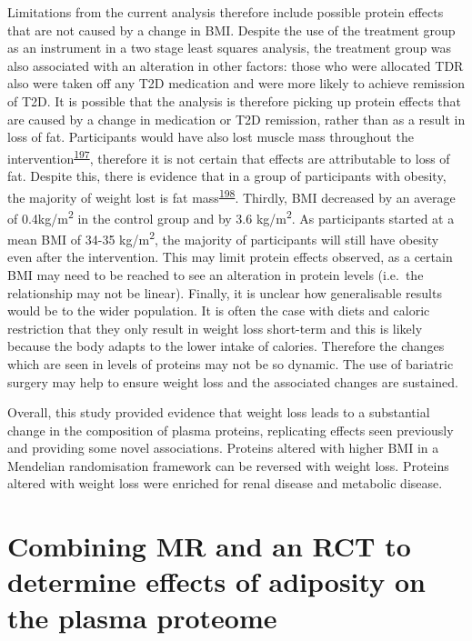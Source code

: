 \documentclass[11pt,twoside]{bristolthesis}
\begin{document}
Limitations from the current analysis therefore include possible protein effects that are not caused by a change in BMI. Despite the use of the treatment group as an instrument in a two stage least squares analysis, the treatment group was also associated with an alteration in other factors: those who were allocated TDR also were taken off any T2D medication and were more likely to achieve remission of T2D. It is possible that the analysis is therefore picking up protein effects that are caused by a change in medication or T2D remission, rather than as a result in loss of fat. Participants would have also lost muscle mass throughout the intervention\textsuperscript{\protect\hyperlink{ref-Santanasto2011}{197}}, therefore it is not certain that effects are attributable to loss of fat. Despite this, there is evidence that in a group of participants with obesity, the majority of weight lost is fat mass\textsuperscript{\protect\hyperlink{ref-Backx2016}{198}}. Thirdly, BMI decreased by an average of 0.4kg/m\textsuperscript{2} in the control group and by 3.6 kg/m\textsuperscript{2}. As participants started at a mean BMI of 34-35 kg/m\textsuperscript{2}, the majority of participants will still have obesity even after the intervention. This may limit protein effects observed, as a certain BMI may need to be reached to see an alteration in protein levels (i.e.~the relationship may not be linear). Finally, it is unclear how generalisable results would be to the wider population. It is often the case with diets and caloric restriction that they only result in weight loss short-term and this is likely because the body adapts to the lower intake of calories. Therefore the changes which are seen in levels of proteins may not be so dynamic. The use of bariatric surgery may help to ensure weight loss and the associated changes are sustained.

Overall, this study provided evidence that weight loss leads to a substantial change in the composition of plasma proteins, replicating effects seen previously and providing some novel associations. Proteins altered with higher BMI in a Mendelian randomisation framework can be reversed with weight loss. Proteins altered with weight loss were enriched for renal disease and metabolic disease.

\hypertarget{Comparison-proteome}{%
\chapter{Combining MR and an RCT to determine effects of adiposity on the plasma proteome}\label{Comparison-proteome}}
\end{document}
